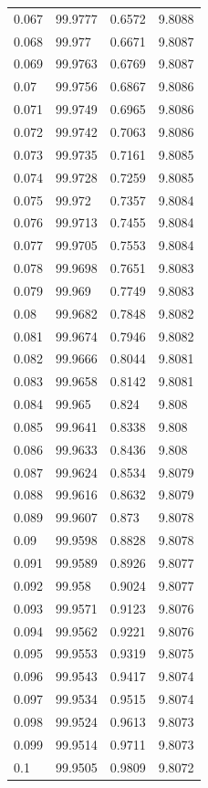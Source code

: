 \begin{tabular}{llll}
0.067 & 99.9777 & 0.6572 & 9.8088 \\
0.068 & 99.977 & 0.6671 & 9.8087 \\
0.069 & 99.9763 & 0.6769 & 9.8087 \\
0.07 & 99.9756 & 0.6867 & 9.8086 \\
0.071 & 99.9749 & 0.6965 & 9.8086 \\
0.072 & 99.9742 & 0.7063 & 9.8086 \\
0.073 & 99.9735 & 0.7161 & 9.8085 \\
0.074 & 99.9728 & 0.7259 & 9.8085 \\
0.075 & 99.972 & 0.7357 & 9.8084 \\
0.076 & 99.9713 & 0.7455 & 9.8084 \\
0.077 & 99.9705 & 0.7553 & 9.8084 \\
0.078 & 99.9698 & 0.7651 & 9.8083 \\
0.079 & 99.969 & 0.7749 & 9.8083 \\
0.08 & 99.9682 & 0.7848 & 9.8082 \\
0.081 & 99.9674 & 0.7946 & 9.8082 \\
0.082 & 99.9666 & 0.8044 & 9.8081 \\
0.083 & 99.9658 & 0.8142 & 9.8081 \\
0.084 & 99.965 & 0.824 & 9.808 \\
0.085 & 99.9641 & 0.8338 & 9.808 \\
0.086 & 99.9633 & 0.8436 & 9.808 \\
0.087 & 99.9624 & 0.8534 & 9.8079 \\
0.088 & 99.9616 & 0.8632 & 9.8079 \\
0.089 & 99.9607 & 0.873 & 9.8078 \\
0.09 & 99.9598 & 0.8828 & 9.8078 \\
0.091 & 99.9589 & 0.8926 & 9.8077 \\
0.092 & 99.958 & 0.9024 & 9.8077 \\
0.093 & 99.9571 & 0.9123 & 9.8076 \\
0.094 & 99.9562 & 0.9221 & 9.8076 \\
0.095 & 99.9553 & 0.9319 & 9.8075 \\
0.096 & 99.9543 & 0.9417 & 9.8074 \\
0.097 & 99.9534 & 0.9515 & 9.8074 \\
0.098 & 99.9524 & 0.9613 & 9.8073 \\
0.099 & 99.9514 & 0.9711 & 9.8073 \\
0.1 & 99.9505 & 0.9809 & 9.8072 \\

\end{tabular}
